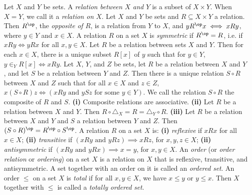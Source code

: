  Let $X$ and $Y$ be sets. A \textit{relation between $X$ and $Y$} is a subset of $X \times Y$. When $X = Y$, we call it a \textit{relation on $X$}.
 Let $X$ and $Y$ be sets and $R \subseteq X \times Y$ a relation. Then $R^{\op}$, the \textit{opposite of $R$}, is a relation from $Y$ to $X$, and $y R^{\op}x \iff xRy$, where $y \in Y$ and $x \in X$.
 A relation $R$ on a set $X$ is \textit{symmetric} if $R^{\op} = R$, i.e. if $xRy \iff yRx$ for all $x, y \in X$.
 Let $R$ be a relation between sets $X$ and $Y$. Then for each $x \in X$, there is a unique subset $R[x]$ of $y$ such that for $y \in Y$, $y \in_Y R[x] \iff xRy$.
 Let $X$, $Y$, and $Z$ be sets, let $R$ be a relation between $X$ and $Y$, and let $S$ be a relation between $Y$ and $Z$. Then there is a unique relation $S \circ R$ between $X$ and $Z$ such that for all $x \in X$ and $z \in Z$, $x(S \circ R)z \iff (xRy \text{ and } ySz \text{ for some } y \in Y)$. We call the relation $S \circ R$ the composite of $R$ and $S$.
 \textbf{(i)} Composite relations are associative. \textbf{(ii)} Let $R$ be a relation between $X$ and $Y$. Then $R \circ \triangle_X = R = \triangle_Y \circ R$. \textbf{(iii)} Let $R$ be a relation between $X$ and $Y$ and $S$ a relation between $Y$ and $Z$. Then $(S \circ R)^{\op} = R^{\op} \circ S^{\op}$.
 A relation $R$ on a set $X$ is: \textbf{(i)} \textit{reflexive} if $xRx$ for all $x \in X$; \textbf{(ii)} \textit{transitive} if $(xRy \text{ and } yRz) \implies xRz$, for $x, y, z \in X$; \textbf{(ii)} \textit{antisymmetric} if $(xRy \text{ and } yRx) \implies x = y$, for $x, y \in X$.
 An \textit{order} (or \textit{order relation} or \textit{ordering}) on a set $X$ is a relation on $X$ that is reflexive, transitive, and antisymmetric. A set together with an order on it is called an \textit{ordered set}.
 An order $\leq$ on a set $X$ is \textit{total} if for all $x, y \in X$, we have $x \leq y$ or $y \leq x$. Then $X$ together with $\leq$ is called a \textit{totally ordered set}.
